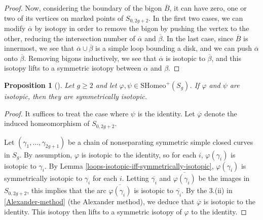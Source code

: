 \documentclass[reqno]{amsart}
\newtheorem{proposition}[theorem]{Proposition}
\theoremstyle{definition}
\theoremstyle{remark}
\newcommand{\SHomeo}{{\mathrm{SHomeo}}}
\begin{document}
\begin{proof}
        Now, considering the boundary of the bigon $\overline{B}$,
        it can have zero, one or two of its vertices on
        marked points of $S_{0,2g+2}$. In the first two cases,
        we can modify $\overline{\alpha}$ by isotopy
        in order to remove the bigon by pushing the
        vertex to the other, reducing the intersection
        number of $\overline{\alpha}$ and $\overline{\beta}$.
        In the last case, since $\overline{B}$ is innermost,
        we see that $\overline{\alpha} \cup 
        \overline{\beta}$ is a simple loop bounding
        a disk, and we can push $\overline{\alpha}$ onto
        $\overline{\beta}$. Removing bigons inductively,
        we see that $\overline{\alpha}$ is isotopic
        to $\overline{\beta}$, and this isotopy lifts to a
        symmetric isotopy between $\alpha$ and $\beta$.
   \end{proof}

   \begin{proposition}[]\label{isotopic-iff-symmetrically-isotopic}
       Let $g \ge 2$ and let $\varphi , \psi \in 
       \SHomeo^{+} (S_g)$. If $\varphi $ and $\psi$ are
       isotopic, then they are symmetrically isotopic.
   \end{proposition}

   \begin{proof}
       It suffices to treat the case where
       $\psi $ is the identity. Let
       $\overline{\varphi }$ denote the induced
       homeomorphism
       of $S_{0, 2g+2}$.
       
       Let $\left( \gamma_1, \ldots, \gamma_{2g+1} \right) $ 
       be a chain of nonseparating symmetric
       simple closed curves in $S_g$. By assumption,
       $\varphi $ is isotopic to the identity, so for
       each $i$, $\varphi \left( \gamma_i \right) $ is
       isotopic to $\gamma_i$. By Lemma
       \ref{loops-isotopic-iff-symmetrically-isotopic},
       $\varphi  \left( \gamma_i \right) $ is symmetrically
       isotopic to $\gamma_i$ for each $i$.
       Letting $\overline{\gamma_i}$ and $
       \overline{\varphi \left( \gamma_i \right) }$ be
       the images in $S_{0,2g+2}$, this implies that
       the arc $\overline{\varphi \left( \gamma_i \right) }$ is
       isotopic to $\overline{\gamma_i}$. By the
       3.(ii) in \ref{Alexander-method}
       (the Alexander method), we deduce that
       $\overline{\varphi }$ is isotopic to the identity.
       This isotopy then lifts to a symmetric isotopy
       of $\varphi $ to the identity.
   \end{proof}
\end{document}
